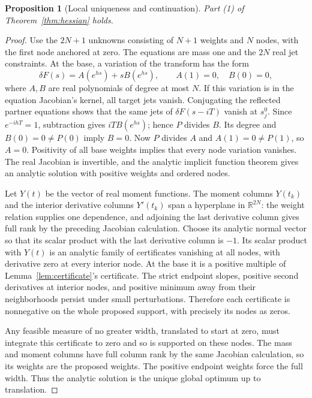 \documentclass[11pt]{article}
\newtheorem{proposition}[theorem]{Proposition}
\theoremstyle{remark}\newtheorem{remark}[theorem]{Remark}
\newcommand{\R}{\mathbb R}\newcommand{\C}{\mathbb C}
\begin{document}
\begin{proposition}[Local uniqueness and continuation]\label{prop:analytic}
Part (1) of Theorem~\ref{thm:hessian} holds.
\end{proposition}
\begin{proof}
Use the $2N+1$ unknowns consisting of $N+1$ weights and $N$ nodes, with the first node anchored at zero. The equations are mass one and the $2N$ real jet constraints. At the base, a variation of the transform has the form
\[
 \delta F(s)=A(e^{hs})+sB(e^{hs}),\qquad A(1)=0,\quad B(0)=0,
\]
where $A,B$ are real polynomials of degree at most $N$. If this variation is in the equation Jacobian's kernel, all target jets vanish. Conjugating the reflected partner equations shows that the same jets of $\delta F(s-iT)$ vanish at $s_j^0$. Since $e^{-ihT}=1$, subtraction gives $iTB(e^{hs})$; hence $P$ divides $B$. Its degree and $B(0)=0\ne P(0)$ imply $B=0$. Now $P$ divides $A$ and $A(1)=0\ne P(1)$, so $A=0$. Positivity of all base weights implies that every node variation vanishes. The real Jacobian is invertible, and the analytic implicit function theorem gives an analytic solution with positive weights and ordered nodes.

Let $Y(t)$ be the vector of real moment functions. The moment columns $Y(t_k)$ and the interior derivative columns $Y'(t_k)$ span a hyperplane in $\R^{2N}$: the weight relation supplies one dependence, and adjoining the last derivative column gives full rank by the preceding Jacobian calculation. Choose its analytic normal vector so that its scalar product with the last derivative column is $-1$. Its scalar product with $Y(t)$ is an analytic family of certificates vanishing at all nodes, with derivative zero at every interior node. At the base it is a positive multiple of Lemma~\ref{lem:certificate}'s certificate. The strict endpoint slopes, positive second derivatives at interior nodes, and positive minimum away from their neighborhoods persist under small perturbations. Therefore each certificate is nonnegative on the whole proposed support, with precisely its nodes as zeros.

Any feasible measure of no greater width, translated to start at zero, must integrate this certificate to zero and so is supported on these nodes. The mass and moment columns have full column rank by the same Jacobian calculation, so its weights are the proposed weights. The positive endpoint weights force the full width. Thus the analytic solution is the unique global optimum up to translation.
\end{proof}
\end{document}

